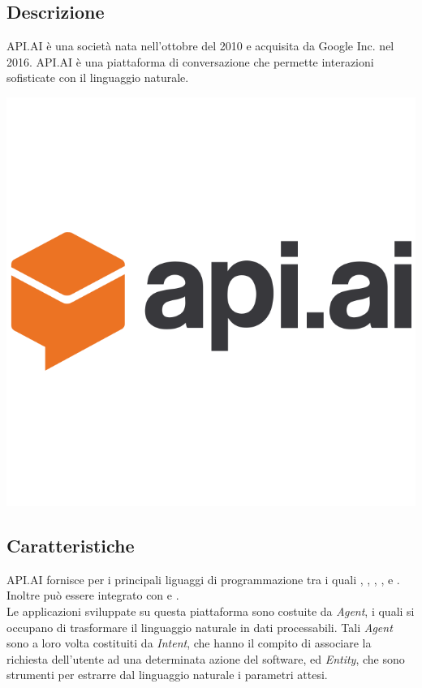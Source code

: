 \documentclass[a4paper,titlepage]{article}
\begin{document}
	\subsection{Descrizione}
	\begin{minipage}{0.7\textwidth}\raggedright
		API.AI è una società nata nell'ottobre del 2010 e acquisita da Google Inc. nel 2016.
		API.AI è una piattaforma di conversazione che permette interazioni sofisticate con il linguaggio naturale.
	\end{minipage}
	\hfill
	\noindent\begin{minipage}{0.1\textwidth}
		\includegraphics[scale=0.15]{images/apiai.png}
	\end{minipage}
	\subsection{Caratteristiche}
	API.AI fornisce  per i principali liguaggi di programmazione tra i quali , , , ,  e . Inoltre può essere integrato con  e .\\
	Le applicazioni sviluppate su questa piattaforma sono costuite da \textit{Agent}, i quali si occupano di trasformare il linguaggio naturale in dati processabili.
	Tali \textit{Agent} sono a loro volta costituiti da \textit{Intent}, che hanno il compito di associare la richiesta dell'utente ad una determinata azione del software, ed \textit{Entity}, che sono strumenti per estrarre dal linguaggio naturale i parametri attesi.\\
	
\end{document}
